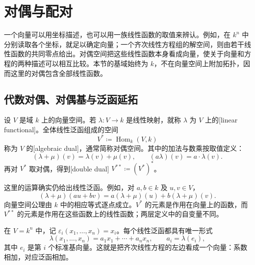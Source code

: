 
\section{对偶与配对}
\label{b2:sec:0102}


一个向量可以用坐标描述，也可以用一族线性函数的取值来辨认。例如，在 \(k^n\) 中分别读取各个坐标，就足以确定向量；一个齐次线性方程组的解空间，则由若干线性函数的共同零点给出。对偶空间把这些线性函数本身看成向量，使关于向量和方程的两种描述可以相互比较。本节的基域始终为 \(k\)，不在向量空间上附加拓扑，因而这里的对偶包含全部线性函数。

\subsection{代数对偶、对偶基与泛函延拓}
\label{b2:subsec:0102:01}

\begin{definition}\label{b2:def:algebraic-dual}
	设 \(V\) 是域 \(k\) 上的向量空间。若 \(\lambda:V\to k\) 是线性映射，就称 \(\lambda\) 为 \(V\) 上的[linear functional]。全体线性泛函组成的空间
	\[
		V^*\coloneqq\operatorname{Hom}_k(V,k)
	\]
	称为 \(V\) 的[algebraic dual]，通常简称对偶空间。其中的加法与数乘按取值定义：
	\[
		(\lambda+\mu)(v)=\lambda(v)+\mu(v),\qquad (a\lambda)(v)=a\cdot\lambda(v).
	\]
	再对 \(V^*\) 取对偶，得到[double dual] \(V^{**}\coloneqq(V^*)^*\)。
\end{definition}

这里的运算确实仍给出线性泛函。例如，对 \(a,b\in k\) 及 \(u,v\in V\)，
\[
	(\lambda+\mu)(au+bv) =a(\lambda+\mu)(u)+b(\lambda+\mu)(v).
\]
向量空间公理由 \(k\) 中的相应等式逐点成立。\(V^*\) 的元素是作用在向量上的函数，而 \(V^{**}\) 的元素是作用在这些函数上的线性函数；两层定义中的自变量不同。

\ProseParagraphBreak
在 \(V=k^n\) 中，记 \(\varepsilon_i(x_1,\ldots,x_n)=x_i\)。每个线性泛函都具有唯一形式
\[
	\lambda(x_1,\ldots,x_n)=a_1x_1+\cdots+a_nx_n, \qquad a_i=\lambda(e_i),
\]
其中 \(e_i\) 是第 \(i\) 个标准基向量。这就是把齐次线性方程的左边看成一个向量：系数相加，对应泛函相加。

